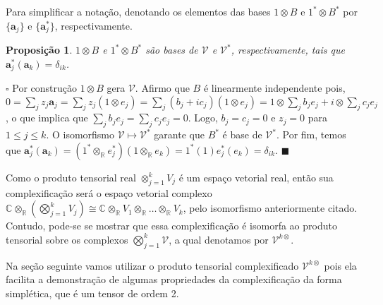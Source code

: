 \documentclass[12pt]{book}
\newtheorem{proposicao}[teorema]{Proposição}
\newenvironment{prova}[1]{$\square$ #1}{\hfill$\blacksquare$}
\newcommand{\complexificacaotensorial}[1]{\complexo{}\otimes_{\reta} #1}
\newcommand{\complexificado}[1]{\mathcal{#1}}
\newcommand{\complexificacaoelemento}[2]{#1\otimes_{\reta} #2}
\newcommand{\complexo}[1]{\mathbb{C}^{#1}}
\newcommand{\produtotensorialreal}[2]{\bigotimes_{j=1}^{#1} #2_{j}}
\newcommand{\real}[1]{\mathbb{R}^{#1}}
\newcommand{\reta}{\real{}}
\begin{document}
	Para simplificar a notação, denotando os elementos das bases $1\otimes B$ e $1^{*}\otimes B^{*}$ por $\{\textbf{a}_{j}\} $ e $\{\textbf{a}^{*}_{j}\}$, respectivamente.
	
	\begin{proposicao}\label{proposicao_base_complexificada}
		$1\otimes B$ e $1^{*}\otimes B^{*}$ são bases de $\complexificado{V}$ e $\complexificado{V}^{*}$, respectivamente, tais que $\textbf{a}^{*}_{j}(\textbf{a}_{k})=\delta_{ik}$.
	\end{proposicao}
	\begin{prova}
		Por construção $1\otimes B$ gera $\complexificado{V}$. Afirmo que $B$ é linearmente independente pois, $0=\sum_{j}z_{j}\textbf{a}_{j} = \sum_{j}z_{j}(1\otimes e_{j}) = \sum_{j}(b_{j} +ic_{j})(1\otimes e_{j}) = 1\otimes \sum_{j}b_{j}e_{j}+i\otimes \sum_{j}c_{j}e_{j}$, o que implica que $\sum_{j}b_{j}e_{j}=\sum_{j}c_{j}e_{j} = 0$. Logo, $b_{j}=c_{j}=0$  e $z_{j} = 0$ para $1\leq j\leq k$. O isomorfismo $\complexificado{V} \mapsto \complexificado{V}^{*}$ garante que $B^{*}$ é base de $\complexificado{V}^{*}$. Por fim, temos que $\textbf{a}^{*}_{j}(\textbf{a}_{k})=(\complexificacaoelemento{1^{*}}{e^{*}_{j}})(\complexificacaoelemento{1}{e_{k}}) = 1^{*}(1)e^{*}_{j}(e_{k}) = \delta_{ik}$.
	\end{prova}
	
	Como o produto tensorial real $\otimes_{j=1}^{k}V_{j}$ é um espaço vetorial real, então sua complexificação será o espaço vetorial complexo $\complexificacaotensorial{(\produtotensorialreal{k}{V})} \cong \complexificacaotensorial{V_{1} \otimes_{\reta} \dots \otimes_{\reta} V_{k}}$, pelo isomorfismo anteriormente citado. Contudo, pode-se se mostrar que essa complexificação é isomorfa ao produto tensorial sobre os complexos $\bigotimes^{k}_{j=1}\complexificado{V}$, a qual denotamos por $\complexificado{V}^{k\otimes}$. 
	
	Na seção seguinte vamos utilizar o produto tensorial complexificado $\complexificado{V}^{k\otimes}$ pois ela facilita a demonstração de algumas propriedades da complexificação da forma simplética, que é um tensor de ordem 2.
	
\end{document}
